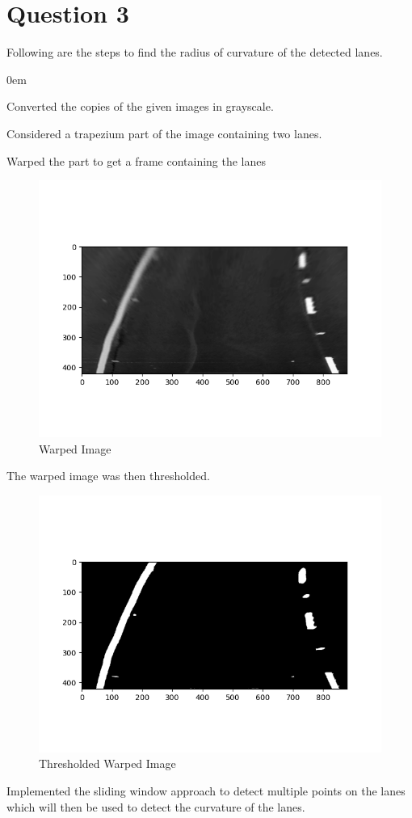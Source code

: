 \documentclass[11pt]{article}
\begin{document}
\section{Question 3}
Following are the steps to find the radius of curvature of the detected lanes.
\begin{description}
\addtolength{\itemindent}{0.80cm}
\itemsep0em 
\item[1.] Converted the copies of the given images in grayscale.
\item[2.] Considered a trapezium part of the image containing two lanes.
\item[3.] Warped the part to get a frame containing the lanes
\begin{figure}[H]
  \centering
	\includegraphics[height=0.7\textwidth]{gray}
	\caption{Warped Image} 
\end{figure}
\item[4.] The warped image was then thresholded.
\begin{figure}[H]
  \centering
	\includegraphics[height=0.7\textwidth]{thresh}
	\caption{Thresholded Warped Image} 
\end{figure}
\item[5.] Implemented the sliding window approach to detect multiple points on the lanes which will then be used to detect the curvature of the lanes.


\end{description}
\end{document}
